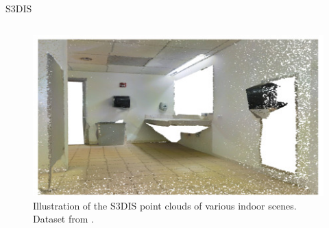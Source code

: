 \documentclass[aspectratio=169]{beamer}
\begin{document}
\begin{frame}{S3DIS}
\begin{columns}
\begin{column}{0.4\textwidth}
\begin{figure}
                \includegraphics[scale=0.35]{images/s3dis/s3dis_sample_2.jpg}
                \caption{Illustration of the S3DIS point clouds of various indoor scenes. Dataset from \cite{Armeni_2016_CVPR_S3DIS}.}
                \label{fig:s3dis_sample_images}
            \end{figure}
        \end{column}
    \end{columns}
\end{frame}
\end{document}
